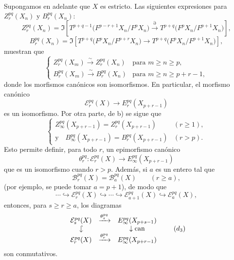 Supongamos en adelante que \(X\) es estricto. Las siguientes expresiones para \(Z_r^{pq}(X_n)\) y \(B_r^{pq}(X_n)\):
\[
Z_r^{pq}(X_n)=
\Im\!\left[
T^{p+q-1}\bigl(F^{p-r+1}X_n/F^pX_n\bigr)
\xrightarrow{\partial}
T^{p+q}\bigl(F^pX_n/F^{p+1}X_n\bigr)
\right],
\]
\[
B_r^{pq}(X_n)=
\Im\!\left[
T^{p+q}\bigl(F^pX_n/F^{p+r}X_n\bigr)
\longrightarrow
T^{p+q}\bigl(F^pX_n/F^{p+1}X_n\bigr)
\right],
\]
muestran que
\begin{equation}
\left\{
\begin{array}{ll}
Z_r^{pq}(X_m)\xrightarrow{\sim}Z_r^{pq}(X_n)&\text{para }m\ge n\ge p,\\[3pt]
B_r^{pq}(X_m)\xrightarrow{\sim}B_r^{pq}(X_n)&\text{para }m\ge n\ge p+r-1,
\end{array}
\right.
\tag{\(d_1\)}
\end{equation}
donde los morfismos canónicos son isomorfismos. En particular, el morfismo canónico
\[
\mathcal E_r^{pq}(X)\longrightarrow E_r^{pq}(X_{p+r-1})
\]
es un isomorfismo. Por otra parte, de b) se sigue que
\begin{equation}
\left\{
\begin{array}{ll}
Z_\infty^{pq}(X_{p+r-1})=Z_r^{pq}(X_{p+r-1})&(r\ge1),\\[3pt]
\text{y}\quad B_\infty^{pq}(X_{p+r-1})=B_r^{pq}(X_{p+r-1})&(r>p).
\end{array}
\right.
\tag{\(d_2\)}
\end{equation}
Esto permite definir, para todo \(r\), un epimorfismo canónico
\[
\theta_r^{pq}:\mathcal E_r^{pq}(X)\longrightarrow E_\infty^{pq}(X_{p+r-1})
\]
que es un isomorfismo cuando \(r>p\). Además, si \(a\) es un entero tal que
\[
\mathcal B_r^{pq}(X)=\mathcal B_a^{pq}(X)\qquad(r\ge a),
\]
(por ejemplo, se puede tomar \(a=p+1\)), de modo que
\begin{equation}
\cdots\hookrightarrow\mathcal E_r^{pq}(X)\hookrightarrow\cdots\hookrightarrow
\mathcal E_{a+1}^{pq}(X)\hookrightarrow\mathcal E_a^{pq}(X),
\tag{S bis}
\end{equation}
entonces, para \(s\ge r\ge a\), los diagramas
\begin{equation}
\begin{array}{ccc}
\mathcal E_s^{pq}(X)&\xrightarrow{\theta_s^{pq}}&E_\infty^{pq}(X_{p+s-1})\\
\rotatebox[origin=c]{-90}{$\hookrightarrow$}&&\downarrow\can\\
\mathcal E_r^{pq}(X)&\xrightarrow{\theta_r^{pq}}&E_\infty^{pq}(X_{p+r-1})
\end{array}
\tag{\(d_3\)}
\end{equation}
son conmutativos.
